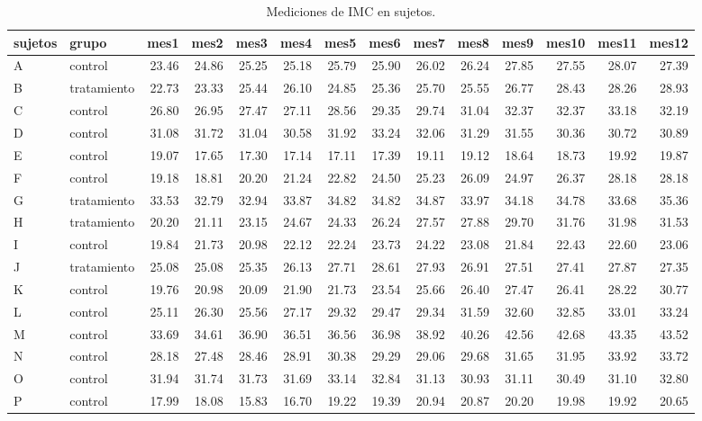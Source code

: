 \documentclass[]{article}
\begin{document}
\begin{table}[H]
\centering
\begingroup\tiny
\begin{tabular}{llrrrrrrrrrrrr}
  \hline
sujetos & grupo & mes1 & mes2 & mes3 & mes4 & mes5 & mes6 & mes7 & mes8 & mes9 & mes10 & mes11 & mes12 \\ 
  \hline
A & control & 23.46 & 24.86 & 25.25 & 25.18 & 25.79 & 25.90 & 26.02 & 26.24 & 27.85 & 27.55 & 28.07 & 27.39 \\ 
  B & tratamiento & 22.73 & 23.33 & 25.44 & 26.10 & 24.85 & 25.36 & 25.70 & 25.55 & 26.77 & 28.43 & 28.26 & 28.93 \\ 
  C & control & 26.80 & 26.95 & 27.47 & 27.11 & 28.56 & 29.35 & 29.74 & 31.04 & 32.37 & 32.37 & 33.18 & 32.19 \\ 
  D & control & 31.08 & 31.72 & 31.04 & 30.58 & 31.92 & 33.24 & 32.06 & 31.29 & 31.55 & 30.36 & 30.72 & 30.89 \\ 
  E & control & 19.07 & 17.65 & 17.30 & 17.14 & 17.11 & 17.39 & 19.11 & 19.12 & 18.64 & 18.73 & 19.92 & 19.87 \\ 
  F & control & 19.18 & 18.81 & 20.20 & 21.24 & 22.82 & 24.50 & 25.23 & 26.09 & 24.97 & 26.37 & 28.18 & 28.18 \\ 
  G & tratamiento & 33.53 & 32.79 & 32.94 & 33.87 & 34.82 & 34.82 & 34.87 & 33.97 & 34.18 & 34.78 & 33.68 & 35.36 \\ 
  H & tratamiento & 20.20 & 21.11 & 23.15 & 24.67 & 24.33 & 26.24 & 27.57 & 27.88 & 29.70 & 31.76 & 31.98 & 31.53 \\ 
  I & control & 19.84 & 21.73 & 20.98 & 22.12 & 22.24 & 23.73 & 24.22 & 23.08 & 21.84 & 22.43 & 22.60 & 23.06 \\ 
  J & tratamiento & 25.08 & 25.08 & 25.35 & 26.13 & 27.71 & 28.61 & 27.93 & 26.91 & 27.51 & 27.41 & 27.87 & 27.35 \\ 
  K & control & 19.76 & 20.98 & 20.09 & 21.90 & 21.73 & 23.54 & 25.66 & 26.40 & 27.47 & 26.41 & 28.22 & 30.77 \\ 
  L & control & 25.11 & 26.30 & 25.56 & 27.17 & 29.32 & 29.47 & 29.34 & 31.59 & 32.60 & 32.85 & 33.01 & 33.24 \\ 
  M & control & 33.69 & 34.61 & 36.90 & 36.51 & 36.56 & 36.98 & 38.92 & 40.26 & 42.56 & 42.68 & 43.35 & 43.52 \\ 
  N & control & 28.18 & 27.48 & 28.46 & 28.91 & 30.38 & 29.29 & 29.06 & 29.68 & 31.65 & 31.95 & 33.92 & 33.72 \\ 
  O & control & 31.94 & 31.74 & 31.73 & 31.69 & 33.14 & 32.84 & 31.13 & 30.93 & 31.11 & 30.49 & 31.10 & 32.80 \\ 
  P & control & 17.99 & 18.08 & 15.83 & 16.70 & 19.22 & 19.39 & 20.94 & 20.87 & 20.20 & 19.98 & 19.92 & 20.65 \\ 
   \hline
\end{tabular}
\endgroup
\caption{Mediciones de IMC en sujetos.} 
\label{tab:sujetos}
\end{table}
\end{document}
